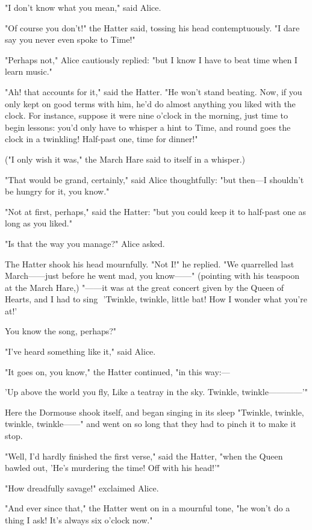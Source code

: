 "I don't know what you mean," said Alice.

"Of course you don't!" the Hatter said, tossing his head contemptuously. "I dare say you never even spoke to Time!"

"Perhaps not," Alice cautiously replied: "but I know I have to beat time when I learn music."

"Ah! that accounts for it," said the Hatter. "He won't stand beating. Now, if you only kept on good terms with him, he'd do almost ​anything you liked with the clock. For instance, suppose it were nine o'clock in the morning, just time to begin lessons: you'd only have to whisper a hint to Time, and round goes the clock in a twinkling! Half-past one, time for dinner!"

("I only wish it was," the March Hare said to itself in a whisper.)

"That would be grand, certainly," said Alice thoughtfully: "but then—I shouldn't be hungry for it, you know."

"Not at first, perhaps," said the Hatter: "but you could keep it to half-past one as long as you liked."

"Is that the way you manage?" Alice asked.

The Hatter shook his head mournfully. "Not I!" he replied. "We quarrelled last March——just before he went mad, you know——" (pointing with his teaspoon at the March Hare,) "——it was at the great concert given by the Queen of Hearts, and I had to sing ​
'Twinkle, twinkle, little bat!
How I wonder what you're at!'

You know the song, perhaps?"

"I've heard something like it," said Alice.

"It goes on, you know," the Hatter continued, "in this way:—

'Up above the world you fly,
Like a teatray in the sky.
⁠Twinkle, twinkle————'"

Here the Dormouse shook itself, and began ​singing in its sleep "Twinkle, twinkle, twinkle, twinkle——" and went on so long that they had to pinch it to make it stop.

"Well, I'd hardly finished the first verse," said the Hatter, "when the Queen bawled out, 'He's murdering the time! Off with his head!'"

"How dreadfully savage!" exclaimed Alice.

"And ever since that," the Hatter went on in a mournful tone, "he won't do a thing I ask! It's always six o'clock now."

